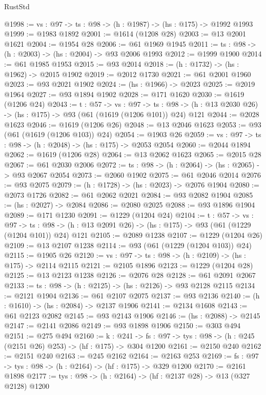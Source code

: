 \begin{lexlean}{RustStd}
\begin{coremodule}
@1998 := {vs : @97} -> {ts : @98} -> (h : @1987) -> (hs : @175) -> @1992 @1993
@1999 := @1983 @1892
@2001 := @1614 (@1208 @28)
@2003 := @13 @2001 @1621
@2004 := @1954 @28
@2006 := @61 @1969 @1945
@2011 := {ts : @98} -> (h : @2003) -> (hs : @2004) -> @93 @2006 @1993
@2012 := @1999 @1900
@2014 := @61 @1985 @1953
@2015 := @93 @2014
@2018 := (h : @1732) -> (hs : @1962) -> @2015 @1902
@2019 := @2012 @1730
@2021 := @61 @2001 @1960
@2023 := @93 @2021 @1902
@2024 := (hs : @1966) -> @2023
@2025 := @2019 @1964
@2027 := @93 @1894 @1902
@2028 := @171 @1620
@2030 := @1619 (@1206 @24)
@2043 := {t : @57} ->
  {vs : @97} ->
  {ts : @98} -> (h : @13 @2030 @26) -> (hs : @175) -> @93 (@61 (@1619 (@1206 @101)) @24) @121
@2044 := @2028 @1623
@2046 := @1619 (@1206 @26)
@2048 := @13 @2046 @1623
@2053 := @93 (@61 (@1619 (@1206 @103)) @24)
@2054 := @1903 @26
@2059 := {vs : @97} -> {ts : @98} -> (h : @2048) -> (hs : @175) -> @2053 @2054
@2060 := @2044 @1894
@2062 := @1619 (@1206 @28)
@2064 := @13 @2062 @1623
@2065 := @2015 @28
@2067 := @61 @2030 @2006
@2072 := {ts : @98} -> (h : @2064) -> (hs : @2065) -> @93 @2067 @2054
@2073 := @2060 @1902
@2075 := @61 @2046 @2014
@2076 := @93 @2075
@2079 := (h : @1728) -> (hs : @2023) -> @2076 @1904
@2080 := @2073 @1726
@2082 := @61 @2062 @2021
@2084 := @93 @2082 @1904
@2085 := (hs : @2027) -> @2084
@2086 := @2080 @2025
@2088 := @93 @1896 @1904
@2089 := @171 @1230
@2091 := @1229 (@1204 @24)
@2104 := {t : @57} ->
  {vs : @97} ->
  {ts : @98} -> (h : @13 @2091 @26) -> (hs : @175) -> @93 (@61 (@1229 (@1204 @101)) @24) @121
@2105 := @2089 @1238
@2107 := @1229 (@1204 @26)
@2109 := @13 @2107 @1238
@2114 := @93 (@61 (@1229 (@1204 @103)) @24)
@2115 := @1905 @26
@2120 := {vs : @97} -> {ts : @98} -> (h : @2109) -> (hs : @175) -> @2114 @2115
@2121 := @2105 @1896
@2123 := @1229 (@1204 @28)
@2125 := @13 @2123 @1238
@2126 := @2076 @28
@2128 := @61 @2091 @2067
@2133 := {ts : @98} -> (h : @2125) -> (hs : @2126) -> @93 @2128 @2115
@2134 := @2121 @1904
@2136 := @61 @2107 @2075
@2137 := @93 @2136
@2140 := (h : @1610) -> (hs : @2084) -> @2137 @1906
@2141 := @2134 @1608
@2143 := @61 @2123 @2082
@2145 := @93 @2143 @1906
@2146 := (hs : @2088) -> @2145
@2147 := @2141 @2086
@2149 := @93 @1898 @1906
@2150 := @303 @494
@2151 := @275 @494
@2160 := {k : @241} ->
  {fs : @97} -> {tys : @98} -> (h : @245 (@2151 @26) @253) -> (hf : @175) -> @304 @1200
@2161 := @2150 @240
@2162 := @2151 @240
@2163 := @245 @2162
@2164 := @2163 @253
@2169 := {fs : @97} -> {tys : @98} -> (h : @2164) -> (hf : @175) -> @329 @1200
@2170 := @2161 @1898
@2177 := {tys : @98} -> (h : @2164) -> (hf : @2137 @28) -> @13 (@327 @2128) @1200

\end{coremodule}
\end{lexlean}
